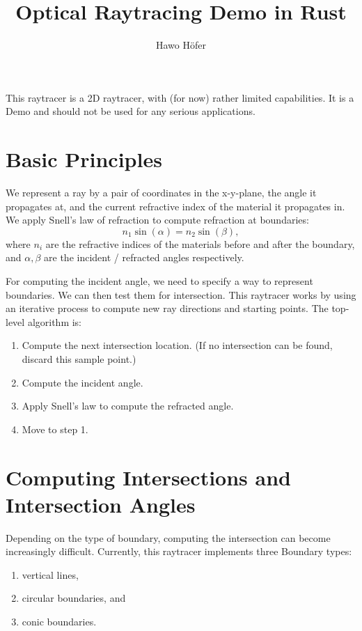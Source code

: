 \documentclass[12pt]{article}
\begin{document}
\author{Hawo Höfer}
\title{Optical Raytracing Demo in Rust}
\maketitle
\tableofcontents
\clearpage

This raytracer is a 2D raytracer, with (for now) rather limited capabilities. It is a
Demo and should not be used for any serious applications.

\clearpage
\section{Basic Principles}
We represent a ray by a pair of coordinates in the x-y-plane, the angle it propagates at,
and the current refractive index of the material it propagates in. We apply Snell's law
of refraction to compute refraction at boundaries:
$$n_1 \sin(\alpha) = n_2 \sin(\beta),$$
where $n_i$ are the refractive indices of the materials before and after the boundary,
and $\alpha, \beta$ are the incident / refracted angles respectively.


For computing the incident angle, we need to specify a way to represent boundaries. We
can then test them for intersection. This raytracer works by using an iterative process
to compute new ray directions and starting points. The top-level algorithm is:
\begin{enumerate}
  \item Compute the next intersection location. (If no intersection can be found, discard
    this sample point.)
  \item Compute the incident angle.
  \item Apply Snell's law to compute the refracted angle.
  \item Move to step 1.
\end{enumerate}

\clearpage
\section{Computing Intersections and Intersection Angles}
Depending on the type of boundary, computing the intersection can become increasingly
difficult. Currently, this raytracer implements three Boundary types:
\begin{enumerate}
  \item vertical lines,
  \item circular boundaries, and
  \item conic boundaries.
\end{enumerate}
\end{document}
